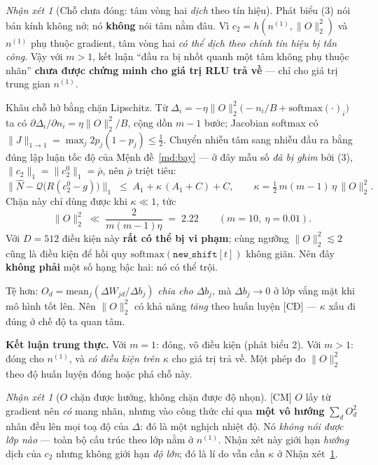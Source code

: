 \documentclass[11pt,a4paper]{article}
\theoremstyle{remark}
\newtheorem{nhanxet}[dinhly]{Nhận xét}
\newcommand{\quant}{\mathcal{Q}}
\newcommand{\CM}{\textsf{[CM]}}
\newcommand{\CD}{\textsf{[CĐ]}}
\begin{document}
\begin{nhanxet}[Chỗ chưa đóng: tâm vòng hai \emph{dịch} theo tín hiệu] \label{nx:rluho}
Phát biểu (3) nói bán kính không nở; nó \textbf{không} nói tâm nằm đâu. Vì
$c_2=h(n^{(1)},\|O\|_2^2)$ và $n^{(1)}$ phụ thuộc gradient, tâm vòng hai
\emph{có thể dịch theo chính tín hiệu bị tấn công}. Vậy với $m>1$, kết luận
``đầu ra bị nhốt quanh một tâm không phụ thuộc nhãn'' \textbf{chưa được chứng
minh cho giá trị RLU trả về} --- chỉ cho giá trị trung gian $n^{(1)}$.

Khâu chỗ hở bằng chặn Lipschitz. Từ
$\Delta_i=-\eta\|O\|_2^2\big(-n_i/B+\mathrm{softmax}(\cdot)_i\big)$ ta có
$\partial\Delta_i/\partial n_i=\eta\|O\|_2^2/B$, cộng dồn $m-1$ bước; Jacobian
softmax có $\|J\|_{1\to1}=\max_j 2p_j(1-p_j)\le\frac12$. Chuyển nhiễu tâm sang
nhiễu đầu ra bằng đúng lập luận tốc độ của Mệnh đề~\ref{md:bay} --- ở đây mẫu số
\emph{đã bị ghim} bởi (3), $\|c_2\|_1=\|c_2^0\|_1=\bar\rho$, nên $\bar\rho$
triệt tiêu:
\[
  \big\|\hat N-\quant\big(R(c_2^{0}-g)\big)\big\|_1
  \;\le\; A_1+\kappa\,(A_1+C)+C,
  \qquad
  \kappa=\tfrac12\,m(m-1)\,\eta\,\|O\|_2^2 .
\]
Chặn này chỉ dùng được khi $\kappa\ll1$, tức
\[
  \|O\|_2^2\;\ll\;\frac{2}{m(m-1)\eta}\;=\;2.22
  \qquad (m=10,\ \eta=0.01).
\]
Với $D=512$ điều kiện này \textbf{rất có thể bị vi phạm}; cùng ngưỡng
$\|O\|_2^2\lesssim2$ cũng là điều kiện để hồi quy
$\mathrm{softmax}(\texttt{new\_shift}[t])$ không giãn. Nên đây \textbf{không
phải} một số hạng bậc hai: nó có thể trội.

Tệ hơn: $O_d=\mathrm{mean}_j(\Delta W_{jd}/\Delta b_j)$ \emph{chia cho}
$\Delta b_j$, mà $\Delta b_j\to0$ ở lớp vắng mặt khi mô hình tốt lên. Nên
$\|O\|_2^2$ có khả năng \emph{tăng} theo huấn luyện \CD{} --- $\kappa$ xấu đi
đúng ở chế độ ta quan tâm.

\textbf{Kết luận trung thực.} Với $m=1$: đóng, vô điều kiện (phát biểu 2). Với
$m>1$: đóng cho $n^{(1)}$, và \emph{có điều kiện trên $\kappa$} cho giá trị trả
về. Một phép đo $\|O\|_2^2$ theo độ huấn luyện đóng hoặc phá chỗ này.
\end{nhanxet}

\begin{nhanxet}[$O$ chặn được hướng, không chặn được độ nhọn] \CM
$O$ lấy từ gradient nên \emph{có} mang nhãn, nhưng vào công thức chỉ qua
\textbf{một vô hướng} $\sum_d O_d^2$ nhân đều lên mọi toạ độ của $\Delta$: đó là
một nghịch nhiệt độ. Nó \emph{không nói được lớp nào} --- toàn bộ cấu trúc theo
lớp nằm ở $n^{(1)}$. Nhận xét này giới hạn \emph{hướng} dịch của $c_2$ nhưng
không giới hạn \emph{độ lớn}; đó là lí do vẫn cần $\kappa$ ở
Nhận xét~\ref{nx:rluho}.
\end{nhanxet}
\end{document}

